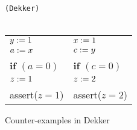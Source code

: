\begin{figure}[!htb]
	\begin{center}
		\texttt{(Dekker)} \\ \ \\
		\begin{tabular}{l||l}
			$ y := 1_{} $ & $ x := 1_{} $ \\
			$ a := x_{} $ & $ c := y_{} $ \\
			\textbf{if} $ (a=0) $ & \textbf{if} $ (c=0) $ \\
			\quad $ z := 1_{} $ & \quad $ z := 2_{} $ \\
			\quad assert($ z=1 $) & \quad assert($ z=2 $) \\
		\end{tabular} 
	\end{center}
\end{figure}

\begin{figure}[!h]
	
	
	\caption{Counter-examples in Dekker}
	\label{fig:dekker-ce}
\end{figure}





